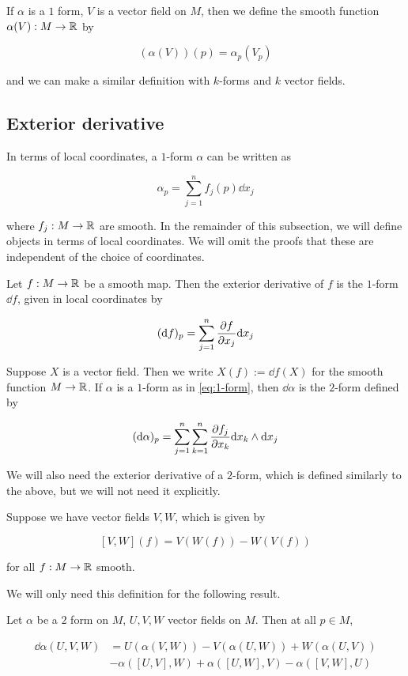 \documentclass{report}
\begin{document}
If \(\alpha\) is a \(1\) form, \(V\) is a vector field on \(M\), then we define the smooth function \(\alpha(V) : M \to \mathbb{R}\) by

\[(\alpha(V))(p) = \alpha_p(V_p)\]

and we can make a similar definition with \(k\)-forms and \(k\) vector fields.

\subsection{Exterior derivative}

In terms of local coordinates, a \(1\)-form \(\alpha\) can be written as

\begin{equation}
    \label{eq:1-form}
    \alpha_p = \sum_{j=1}^n f_j(p)\dd x_j
\end{equation}

where \(f_j : M \to \mathbb{R}\) are smooth. In the remainder of this subsection, we will define objects in terms of local coordinates. We will omit the proofs that these are independent of the choice of coordinates.

Let \(f : M \to \mathbb{R}\) be a smooth map. Then the exterior derivative of \(f\) is the \(1\)-form \(\dd f\), given in local coordinates by

\[(\dd f)_p = \sum_{j=1}^n \pdv{f}{x_j}(p)\dd x_j\]

Suppose \(X\) is a vector field. Then we write \(X(f) := \dd f(X)\) for the smooth function \(M \to \mathbb{R}\). If \(\alpha\) is a \(1\)-form as in \cref{eq:1-form}, then \(\dd\alpha\) is the \(2\)-form defined by

\[(\dd\alpha)_p = \sum_{j=1}^n\sum_{k=1}^n \pdv{f_j}{x_k}(p)\dd x_k \wedge \dd x_j\]

We will also need the exterior derivative of a \(2\)-form, which is defined similarly to the above, but we will not need it explicitly.

\begin{definition}

    Suppose we have vector fields \(V, W\), which is given by

    \[[V, W](f) = V(W(f)) - W(V(f))\]

    for all \(f : M \to \mathbb{R}\) smooth.
\end{definition}

We will only need this definition for the following result.

\begin{lemma}
    \label{lem:deriv-2-form}
    Let \(\alpha\) be a \(2\) form on \(M\), \(U, V, W\) vector fields on \(M\). Then at all \(p \in M\),

    \begin{align*}
        \dd\alpha(U, V, W) &= U(\alpha(V, W)) - V(\alpha(U, W)) + W(\alpha(U, V)) \\
        &- \alpha([U, V], W) + \alpha([U, W], V) - \alpha([V, W], U)
    \end{align*}
\end{lemma}
\end{document}
